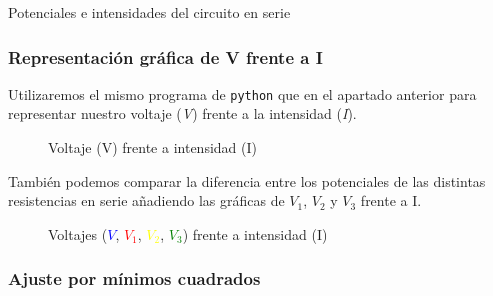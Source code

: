 \documentclass[12pt, a4paper, titlepage]{article}
\newcommand{\code}[1]{\texttt{#1}} %
\begin{document}
  \begin{table}[H]
  \centering
  \caption{Potenciales e intensidades del circuito en serie}
  \end{table}

  \subsubsection{Representación gráfica de V frente a I}

  Utilizaremos el mismo programa de \code{python} que en el apartado anterior para representar nuestro voltaje (\textit{V}) frente a la intensidad (\textit{I}).

  \begin{figure}[H]
    \hspace{2.5em} 
    \caption{Voltaje (V) frente a intensidad (I)}
  \end{figure}

  También podemos comparar la diferencia entre los potenciales de las distintas resistencias en serie añadiendo las gráficas de $V_1$, $V_2$ y $V_3$ frente a I.

  \begin{figure}[H]
    \hspace{2.5em} 
    \caption{Voltajes (\textcolor{Blue}{$V$}, \textcolor{Red}{$V_1$}, \textcolor{Yellow}{$V_2$}, \textcolor{Green}{$V_3$}) frente a intensidad (I)}
  \end{figure}

  \subsubsection{Ajuste por mínimos cuadrados}
  \label{sec:ajusteminimoscuadradosserie}
\end{document}
